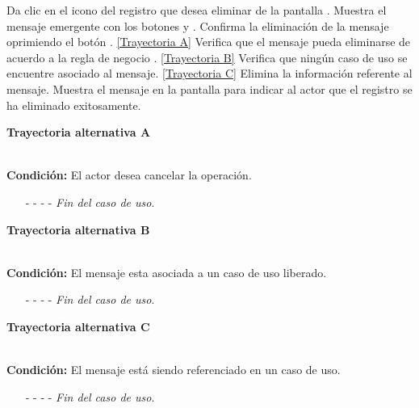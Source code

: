	\begin{UCtrayectoria}
		\UCpaso[\UCactor] Da clic en el icono \eliminar del registro que desea eliminar de la pantalla .
		\UCpaso[\UCsist] Muestra el mensaje emergente  con los botones  y .
		\UCpaso[\UCactor] Confirma la eliminación de la mensaje oprimiendo el botón . \hyperlink{CU9-3:TAA}{[Trayectoria A]}
		\UCpaso[\UCsist] Verifica que el mensaje pueda eliminarse de acuerdo a la regla de negocio . \hyperlink{CU9-3:TAB}{[Trayectoria B]}
		\UCpaso[\UCsist] Verifica que ningún caso de uso se encuentre asociado al mensaje. \hyperlink{CU9-3:TAC}{[Trayectoria C]}
		\UCpaso[\UCsist] Elimina la información referente al mensaje.
		\UCpaso[\UCsist] Muestra el mensaje  en la pantalla  para indicar al actor que el registro se ha eliminado exitosamente.
	\end{UCtrayectoria}

\hypertarget{CU9-3:TAA}{\textbf{Trayectoria alternativa A}}\\
\noindent \textbf{Condición:} El actor desea cancelar la operación.
\begin{enumerate}
	\UCpaso[\UCactor] Oprime el botón  de la pantalla emergente.
	\UCpaso[\UCsist] Muestra la pantalla .
	\item[- -] - - {\em {Fin del caso de uso}}.%
\end{enumerate}		
\hypertarget{CU9-3:TAB}{\textbf{Trayectoria alternativa B}}\\
\noindent \textbf{Condición:} El mensaje esta asociada a un caso de uso liberado.
\begin{enumerate}
	\UCpaso[\UCsist] Oculta el botón \eliminar del mensaje que esta asociado a casos de uso liberados de la pantalla .
	\item[- -] - - {\em {Fin del caso de uso}}.%
\end{enumerate}
\hypertarget{CU9-3:TAC}{\textbf{Trayectoria alternativa C}}\\
\noindent \textbf{Condición:} El mensaje está siendo referenciado en un caso de uso.
\begin{enumerate}
	\UCpaso[\UCsist] Muestra el mensaje  en la pantalla .
	\item[- -] - - {\em {Fin del caso de uso}}.%
\end{enumerate}	

